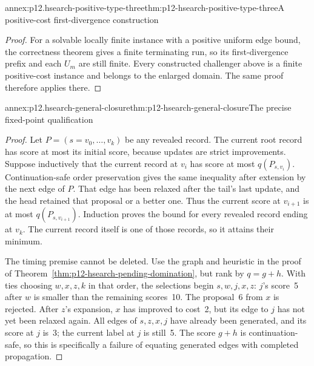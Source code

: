 \begin{annexitem}{annex:p12.hsearch-positive-type-three}{thm:p12-hsearch-positive-type-three}{A positive-cost first-divergence construction}
\begin{proof}
For a solvable locally finite instance with a positive uniform edge
bound, the correctness theorem gives a finite terminating run, so its
first-divergence prefix and each \(U_m\) are still finite. Every
constructed challenger above is a finite positive-cost instance and
belongs to the enlarged domain. The same proof therefore applies there.
\end{proof}
\end{annexitem}

\begin{annexitem}{annex:p12.hsearch-general-closure}{thm:p12-hsearch-general-closure}{The precise fixed-point qualification}
\begin{proof}
Let \(P=(s=v_0,\ldots,v_k)\) be any revealed record. The current
root record has score at most its initial score, because updates are
strict improvements. Suppose inductively that the current record at
\(v_i\) has score at most \(q(P_{s,v_i})\). Continuation-safe
order preservation gives the same inequality after extension by the
next edge of \(P\). That edge has been relaxed after the tail's
last update, and the head retained that proposal or a better one.
Thus the current score at \(v_{i+1}\) is at most
\(q(P_{s,v_{i+1}})\). Induction proves the bound for every revealed
record ending at \(v_k\). The current record itself is one of those
records, so it attains their minimum.

The timing premise cannot be deleted. Use the graph and heuristic in
the proof of Theorem~\ref{thm:p12-hsearch-pending-domination}, but
rank by \(q=g+h\). With ties choosing \(w,x,z,k\) in that order,
the selections begin \(s,w,j,x,z\): \(j\)'s score~5 after
\(w\) is smaller than the remaining scores~10. The proposal~6 from
\(x\) is rejected. After \(z\)'s expansion, \(x\) has
improved to cost~2, but its edge to \(j\) has not yet been relaxed
again. All edges of \(s,z,x,j\) have already been generated, and
its score at \(j\) is~3; the current label at \(j\) is still~5.
The score \(g+h\) is continuation-safe, so this is specifically a
failure of equating generated edges with completed propagation.
\end{proof}
\end{annexitem}

